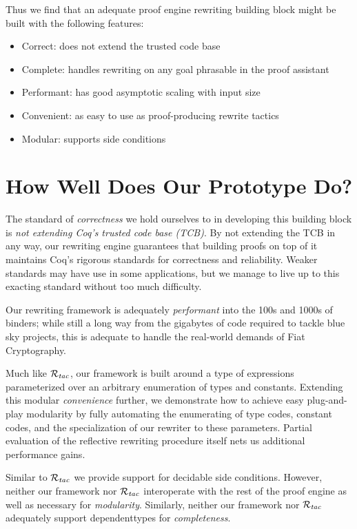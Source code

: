 \documentclass[sn-mathphys,pdflatex]{sn-jnl}%
\newcommand{\Rtac}{\ensuremath{\mathcal{R}_\text{\emph{tac}}}}
\theoremstyle{thmstyleone}%
\theoremstyle{thmstyletwo}%
\theoremstyle{thmstylethree}%
\begin{document}
Thus we find that an adequate proof engine rewriting building block might be built with the following features:

\begin{itemize}
\item Correct: does not extend the trusted code base
\item Complete: handles rewriting on any goal phrasable in the proof assistant
\item Performant: has good asymptotic scaling with input size
\item Convenient: as easy to use as proof-producing rewrite tactics
\item Modular: supports side conditions
\end{itemize}


\section{How Well Does Our Prototype Do?}\label{sec:our-prototype}




The standard of \emph{correctness} we hold ourselves to in developing this building block is \emph{not extending Coq's trusted code base (TCB)}.
By not extending the TCB in any way, our rewriting engine guarantees that building proofs on top of it maintains Coq's rigorous standards for correctness and reliability.
Weaker standards may have use in some applications, but we manage to live up to this exacting standard without too much difficulty.

Our rewriting framework is adequately \emph{performant} into the 100s and 1000s of binders;
 while still a long way from the gigabytes of code required to tackle blue sky projects, this is adequate to handle the real-world demands of Fiat Cryptography.

Much like \Rtac{}, our framework is built around a type of expressions parameterized over an arbitrary enumeration of types and constants.
Extending this modular \emph{convenience} further, we demonstrate how to achieve easy plug-and-play modularity by fully automating the enumerating of type codes, constant codes, and the specialization of our rewriter to these parameters.
Partial evaluation of the reflective rewriting procedure itself nets us additional performance gains.

Similar to \Rtac{} we provide support for decidable side conditions.
However, neither our framework nor \Rtac{} interoperate with the rest of the proof engine as well as necessary for \emph{modularity}.
Similarly,  neither our framework nor \Rtac{}  adequately support dependent\deleted{-}types for \emph{completeness}.
\end{document}

